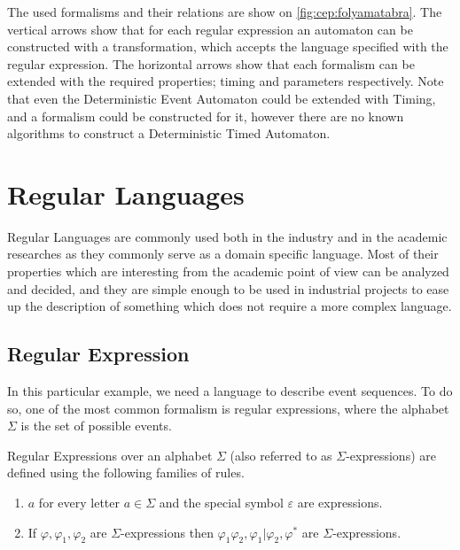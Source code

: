 	The used formalisms and their relations are show on \cref{fig:cep:folyamatabra}.
	The vertical arrows show that for each regular expression an automaton can be constructed with a transformation, which accepts the language specified with the regular expression.
	The horizontal arrows show that each formalism can be extended with the required properties; timing and parameters respectively.
	Note that even the Deterministic Event Automaton could be extended with Timing, and a formalism could be constructed for it, however there are no known algorithms to construct a Deterministic Timed Automaton.
		
	\section{Regular Languages}
	
		Regular Languages are commonly used both in the industry and in the academic researches as they commonly serve as a domain specific language.
		Most of their properties which are interesting from the academic point of view can be analyzed and decided, and they are simple enough to be used in industrial projects to ease up the description of something which does not require a more complex language.
	
		\subsection{Regular Expression}
		
			In this particular example, we need a language to describe event sequences. To do so, one of the most common formalism is regular expressions, where the alphabet $\Sigma$ is the set of possible events.
	
			
			\begin{dfn}
				\label{dfn:cep:re}
				Regular Expressions over an alphabet $\Sigma$ (also referred to as $\Sigma$-expressions)
				are defined using the following families of rules.
				\begin{enumerate}
					\item $a$ for every letter $a \in \Sigma$ and the special symbol $\varepsilon$ are expressions.
					\item If $\varphi, \varphi_1, \varphi_2$ are $\Sigma$-expressions then %
						$ %
						\varphi_1 \varphi_2,
						\varphi_1 | \varphi_2,
						\varphi^\ast
						$ are $\Sigma$-expressions\citep{tre}.
				\end{enumerate}
			\end{dfn}
	
